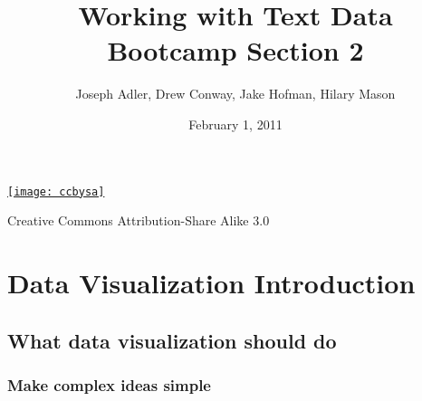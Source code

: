 \documentclass[xcolor=dvipsnames, 9pt]{beamer}
\title{Working with Text Data\\Bootcamp Section 2}
\author{Joseph Adler, Drew Conway, Jake Hofman, Hilary Mason}
\date{February 1, 2011}
\begin{document}
 

\begin{frame}[plain]
  \titlepage 
  
  \tiny
  \href{http://creativecommons.org/licenses/by-sa/3.0/us/}{\texttt{[image: ccbysa]}}

  Creative Commons Attribution-Share Alike 3.0
\end{frame}

\section{Data Visualization Introduction} %
\label{sec:visualization}

\subsection{What data visualization should do} %
\label{sub:what_data_visualization_should_do}

{
\begin{frame}[fragile]
    \frametitle{}
    \vspace{4cm}
    \begin{center}
        \begin{minipage}{5cm}
    \end{minipage}
    \end{center}
\end{frame}
}

\begin{frame}[fragile]
    \frametitle{Make complex ideas \textbf{simple}}
    \begin{center}
    \end{center}
\end{frame}
\end{document}
